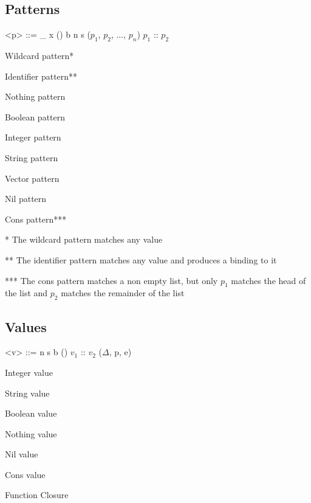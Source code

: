 \documentclass[titlepage]{article}
\begin{document}
\subsection{Patterns}
\begin{minipage}[t]{0.5\textwidth}
\begin{grammar}



<p> ::= _
\alt x
\alt ()
\alt b
\alt n
\alt s
\alt ($p_1$, $p_2$, ..., $p_n$)
\alt [\space]
\alt $p_1$ :: $p_2$

\end{grammar}
\newpage



 
\end{minipage}
\begin{minipage}[t]{0.3\textwidth}
Wildcard pattern*

Identifier pattern**

Nothing pattern

Boolean pattern

Integer pattern

String pattern

Vector pattern

Nil pattern

Cons pattern***

\end{minipage}

* The wildcard pattern matches any value

** The identifier pattern matches any value and produces a binding to it

*** The cons pattern matches a non empty list, but only $p_1$ matches the head of the list and $p_2$ matches the remainder of the list
\subsection{Values}

\begin{minipage}[t]{0.5\textwidth}


\begin{grammar}

  <v> ::= n
  \alt s
  \alt b
  \alt ()
  \alt [\space ]
  \alt $v_1$ :: $v_2$
  \alt ($\Delta$, p, e)
  
  
  \end{grammar} 
\end{minipage}
\begin{minipage}[t]{0.5\textwidth}
  Integer value

  String value

  Boolean value

  Nothing value

  Nil value

  Cons value

  Function Closure

\end{minipage}
\end{document}
